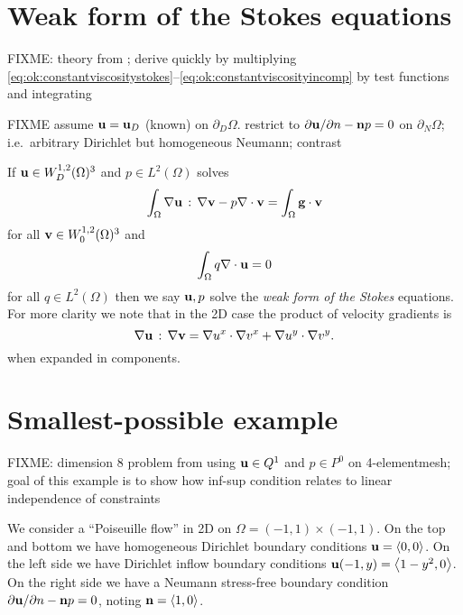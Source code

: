 \section{Weak form of the Stokes equations}

FIXME: theory from \citep{Braess2007,Elmanetal2005}; derive quickly by multiplying \eqref{eq:ok:constantviscositystokes}--\eqref{eq:ok:constantviscosityincomp} by test functions and integrating

FIXME assume $\mathbf{u}=\mathbf{u}_D$ (known) on $\partial_D\Omega$.  restrict to $\partial \mathbf{u}/\partial n - \mathbf{n} p = 0$ on $\partial_N\Omega$; i.e.~arbitrary Dirichlet but homogeneous Neumann; contrast \citep{Elmanetal2005}

If $\mathbf{u} \in W_D^{1,2}(\Omega)^3$ and $p \in L^2(\Omega)$ solves
\begin{equation}
\int_\Omega \nabla \mathbf{u} \,:\, \nabla \mathbf{v} - p \nabla\cdot \mathbf{v} = \int_\Omega \mathbf{g} \cdot \mathbf{v} \label{eq:ok:weakstokesvelocity}
\end{equation}
for all $\mathbf{v} \in W_0^{1,2}(\Omega)^3$ and
\begin{equation}
\int_\Omega q \nabla\cdot \mathbf{u} = 0 \label{eq:ok:weakstokespressure}
\end{equation}
for all $q \in L^2(\Omega)$ then we say $\mathbf{u},p$ solve the \emph{weak form of the Stokes} equations.  For more clarity we note that in the 2D case the product of velocity gradients is
     $$\nabla \mathbf{u} \,:\, \nabla \mathbf{v} = \nabla u^x \cdot \nabla v^x + \nabla u^y \cdot \nabla v^y.$$
when expanded in components.


\section{Smallest-possible example}

FIXME: dimension 8 problem from using $\mathbf{u}\in Q^1$ and $p\in P^0$ on 4-elementmesh; goal of this example is to show how inf-sup condition relates to linear independence of constraints

We consider a ``Poiseuille flow'' \citep{Elmanetal2005} in 2D on $\Omega=(-1,1)\times(-1,1)$.  On the top and bottom we have homogeneous Dirichlet boundary conditions $\mathbf{u}=\left<0,0\right>$.  On the left side we have Dirichlet inflow boundary conditions $\mathbf{u}(-1,y) = \left<1-y^2,0\right>$.  On the right side we have a Neumann stress-free boundary condition $\partial \mathbf{u}/\partial n - \mathbf{n} p = 0$, noting $\mathbf{n} = \left<1,0\right>$.

\newcommand{\one}{{\large \mathbb{1}}}

